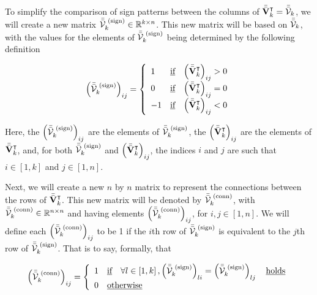 \documentclass[../../ClusteringConnectionsMAIN.tex]{subfiles}
\begin{document}
\begin{flushleft}
\begin{large}

To simplify the comparison of sign patterns between the columns of $\bar{\bar{\mathbf{V}}}_k^\intercal = \bar{\bar{\mathbf{\mathcal{V}}}}_k$, we will create a new matrix $\bar{\bar{\mathbf{\mathcal{V}}}}_k^\text{ (sign)} \in \mathbb{R}^{k \times n}$.  This new matrix will be based on $\bar{\bar{\mathbf{\mathcal{V}}}}_k$, with the values for the elements of $\bar{\bar{\mathbf{\mathcal{V}}}}_k^\text{ (sign)}$ being determined by the following definition

\begin{align}
\left( \bar{\bar{\mathbf{\mathcal{V}}}}_k^\text{ (sign)} \right)_{ij} = \left\{ 
\begin{array}{l c l}
	1 & \text{\underline{if}} & \left( \bar{\bar{\mathbf{V}}}_k^\intercal \right)_{ij} > 0 \\
	0 & \text{\underline{if}} & \left( \bar{\bar{\mathbf{V}}}_k^\intercal \right)_{ij} = 0 \\
	-1 & \text{\underline{if}} & \left( \bar{\bar{\mathbf{V}}}_k^\intercal \right)_{ij} < 0 \\
\end{array} \right.
\end{align}

Here, the $\left( \bar{\bar{\mathbf{\mathcal{V}}}}_k^\text{ (sign)} \right)_{ij}$ are the elements of $\bar{\bar{\mathbf{\mathcal{V}}}}_k^\text{ (sign)}$, the $\left( \bar{\bar{\mathbf{V}}}_k^\intercal \right)_{ij}$ are the elements of $\bar{\bar{\mathbf{V}}}_k^\intercal$, and, for both $\bar{\bar{\mathbf{\mathcal{V}}}}_k^\text{ (sign)}$ and $\left( \bar{\bar{\mathbf{V}}}_k^\intercal \right)_{ij}$, the indices $i$ and $j$ are such that $i \in \left[ 1, k \right]$ and $j \in \left[ 1, n \right]$. \newline


Next, we will create a new $n$ by $n$ matrix to represent the connections between the rows of $\bar{\bar{\mathbf{V}}}_k^\intercal$.  This new matrix will be denoted by $\bar{\bar{\mathbf{\mathcal{V}}}}_k^\text{ (conn)}$, with $\bar{\bar{\mathbf{\mathcal{V}}}}_k^\text{ (conn)} \in \mathbb{R}^{n \times n}$ and having elements $\left( \bar{\bar{\mathbf{\mathcal{V}}}}_k^\text{ (conn)} \right)_{ij}$, for $i, j \in \left[ 1, n \right]$.  We will define each $\left( \bar{\bar{\mathbf{\mathcal{V}}}}_k^\text{ (conn)} \right)_{ij}$ to be 1 if the $i$th row of $\bar{\bar{\mathbf{\mathcal{V}}}}_k^\text{ (sign)}$ is equivalent to the $j$th row of $\bar{\bar{\mathbf{\mathcal{V}}}}_k^\text{ (sign)}$.  That is to say, formally, that

\begin{align}
\left( \bar{\bar{\mathbf{\mathcal{V}}}}_k^\text{ (conn)} \right)_{ij} = \left\{
\begin{array}{l l}
	1 & \text{\underline{if}} \quad \forall l \in \left[ 1, k \right], \left( \bar{\bar{\mathbf{\mathcal{V}}}}_k^\text{ (sign)} \right)_{li} = \left( \bar{\bar{\mathbf{\mathcal{V}}}}_k^\text{ (sign)} \right)_{lj} \quad \text{\underline{holds}} \\
	0 & \text{\underline{otherwise}} 
\end{array} \right.
\end{align}


\end{large}
\end{flushleft}
\end{document}
